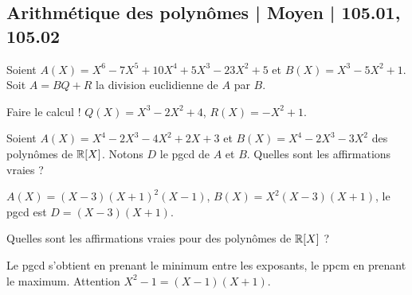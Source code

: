 \subsection{Arithmétique des polynômes | Moyen | 105.01, 105.02}

\begin{question}
Soient $A(X) = X^6 - 7 X^5 + 10 X^4 + 5 X^3 - 23 X^2 + 5$ et $B(X) = X^3-5X^2+1$. Soit $A = BQ+R$ la division euclidienne de $A$ par $B$.
\begin{answers}



\end{answers}
\begin{explanations}
Faire le calcul !
$Q(X) = X^3-2X^2+4$, $R(X) = -X^2+1$.
\end{explanations}
\end{question}

\begin{question}

Soient $A(X) = X^4 - 2 X^3 - 4 X^2 + 2 X + 3$ et 
$B(X) = X^4 - 2 X^3 - 3 X^2$ des polynômes de $\mathbb{R}[X]$.
Notons $D$ le pgcd de $A$ et $B$.
Quelles sont les affirmations vraies  ?
\begin{answers}



\end{answers}
\begin{explanations}
$A(X) = (X-3)(X+1)^2(X-1)$, $B(X) = X^2(X-3)(X+1)$,
le pgcd est $D = (X-3)(X+1)$. 
\end{explanations}
\end{question}


\begin{question}
Quelles sont les affirmations vraies pour des polynômes de $\mathbb{R}[X]$ ?
\begin{answers}
    

    
\end{answers}
\begin{explanations}
Le pgcd s'obtient en prenant le minimum entre les exposants, le ppcm en prenant le maximum. Attention $X^2-1=(X-1)(X+1)$.
\end{explanations}
\end{question}





